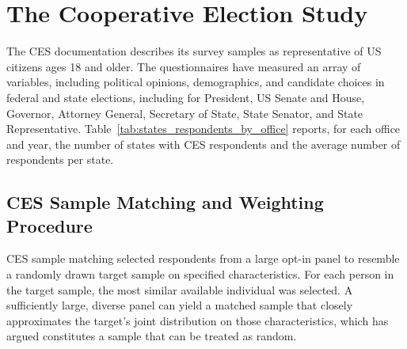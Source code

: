 \documentclass[12pt]{article}
\begin{document}

 


\section*{The Cooperative Election Study}
The CES documentation describes its survey samples as representative of US citizens ages 18 and older. The questionnaires have measured an array of variables, including political opinions, demographics, and candidate choices in federal and state elections, including for President, US Senate and House, Governor, Attorney General, Secretary of State, State Senator, and State Representative. Table~\ref{tab:states_respondents_by_office} reports, for each office and year, the number of states with CES respondents and the average number of respondents per state.



\subsection*{CES Sample Matching and Weighting Procedure}
CES sample matching selected respondents from a large opt-in panel to resemble a randomly drawn target sample on specified characteristics. For each person in the target sample, the most similar available individual was selected. A sufficiently large, diverse panel can yield a matched sample that closely approximates the target's joint distribution on those characteristics, which \textcite{rivers_sample_2006} has argued constitutes a sample that can be treated as random.
\end{document}
